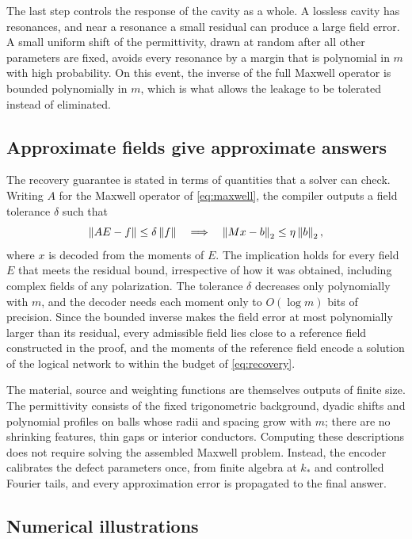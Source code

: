 The last step controls the response of the cavity as a whole. A lossless
cavity has resonances, and near a resonance a small residual can produce a
large field error. A small uniform shift of the permittivity, drawn at random
after all other parameters are fixed, avoids every resonance by a margin that
is polynomial in $m$ with high probability. On this event, the inverse of the
full Maxwell operator is bounded polynomially in $m$, which is what allows the
leakage to be tolerated instead of eliminated.

\subsection{Approximate fields give approximate answers}

The recovery guarantee is stated in terms of quantities that a solver can
check. Writing $A$ for the Maxwell operator of \cref{eq:maxwell}, the compiler
outputs a field tolerance $\delta$ such that
\begin{equation}
 \left\lVert AE-f\right\rVert\le\delta\left\lVert f\right\rVert
 \quad\Longrightarrow\quad
 \left\lVert Mx-b\right\rVert_2\le\eta\left\lVert b\right\rVert_2,
 \label{eq:recovery}
\end{equation}
where $x$ is decoded from the moments of $E$. The implication holds for every
field $E$ that meets the residual bound, irrespective of how it was obtained,
including complex fields of any polarization. The tolerance $\delta$ decreases
only polynomially with $m$, and the decoder needs each moment only to
$O(\log m)$ bits of precision. Since the bounded inverse makes the field
error at most polynomially larger than its residual, every admissible field
lies close to a reference field constructed in the proof, and the moments of
the reference field encode a solution of the logical network to within the
budget of \cref{eq:recovery}.

The material, source and weighting functions are themselves outputs of finite
size. The permittivity consists of the fixed trigonometric background,
dyadic shifts and polynomial profiles on balls whose radii and spacing grow
with $m$; there are no shrinking features, thin gaps or interior conductors.
Computing these descriptions does not require solving the assembled Maxwell
problem. Instead, the encoder calibrates the defect parameters once, from
finite algebra at $k_*$ and controlled Fourier tails, and every approximation
error is propagated to the final answer.

\subsection{Numerical illustrations}

